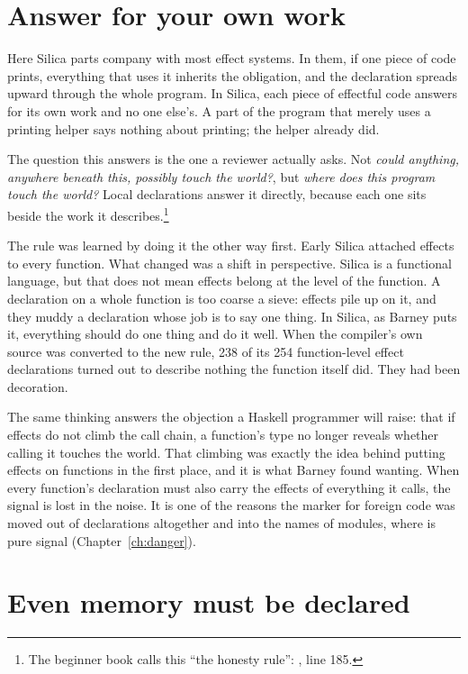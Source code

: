 \section{Answer for your own work}

Here Silica parts company with most effect systems. In them, if one piece of
code prints, everything that uses it inherits the obligation, and the
declaration spreads upward through the whole program. In Silica, each piece of
effectful code answers for its own work and no one else's. A part of the
program that merely uses a printing helper says nothing about printing; the
helper already did.

The question this answers is the one a reviewer actually asks. Not \emph{could
anything, anywhere beneath this, possibly touch the world?}, but \emph{where
does this program touch the world?} Local declarations answer it directly,
because each one sits beside the work it describes.\footnote{The beginner book
calls this ``the honesty rule'': , line 185.}

The rule was learned by doing it the other way first. Early Silica attached
effects to every function. What changed was a shift in perspective. Silica is a
functional language, but that does not mean effects belong at the level of the
function. A declaration on a whole function is too coarse a sieve: effects pile
up on it, and they muddy a declaration whose job is to say one thing. In Silica,
as Barney puts it, everything should do one thing and do it well. When the
compiler's own source was converted to the new rule, 238 of its 254
function-level effect declarations turned out to describe nothing the function
itself did. They had been decoration.

The same thinking answers the objection a Haskell programmer will raise: that if
effects do not climb the call chain, a function's type no longer reveals whether
calling it touches the world. That climbing was exactly the idea behind putting
effects on functions in the first place, and it is what Barney found wanting.
When every function's declaration must also carry the effects of everything it
calls, the signal is lost in the noise. It is one of the reasons the marker for
foreign code was moved out of declarations altogether and into the names of
modules, where  is pure signal (Chapter~\ref{ch:danger}).

\section{Even memory must be declared}


